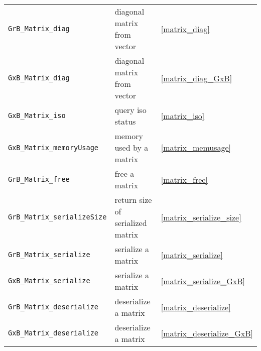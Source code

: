 \documentclass[12pt]{article}
\begin{document}
{\begin{tabular}{lll}
\verb'GrB_Matrix_diag'          & diagonal matrix from vector           & \ref{matrix_diag} \\
\verb'GxB_Matrix_diag'          & diagonal matrix from vector           & \ref{matrix_diag_GxB} \\
\verb'GxB_Matrix_iso'           & query iso status                      & \ref{matrix_iso} \\
\verb'GxB_Matrix_memoryUsage'   & memory used by a matrix               & \ref{matrix_memusage} \\
\verb'GrB_Matrix_free'          & free a matrix                         & \ref{matrix_free} \\
\hline
\hline
\verb'GrB_Matrix_serializeSize' & return size of serialized matrix & \ref{matrix_serialize_size} \\
\verb'GrB_Matrix_serialize'     & serialize a matrix               & \ref{matrix_serialize} \\
\verb'GxB_Matrix_serialize'     & serialize a matrix               & \ref{matrix_serialize_GxB} \\
\verb'GrB_Matrix_deserialize'   & deserialize a matrix             & \ref{matrix_deserialize} \\
\verb'GxB_Matrix_deserialize'   & deserialize a matrix             & \ref{matrix_deserialize_GxB} \\
\hline
\end{tabular}
}
\end{document}
